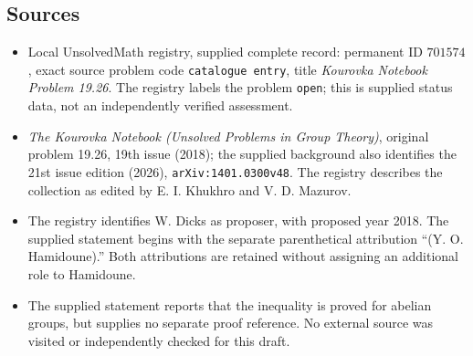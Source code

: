 \documentclass[11pt]{article}
\begin{document}
\subsection{Sources}
\begin{itemize}
\item Local UnsolvedMath registry, supplied complete record: permanent ID \(701574\), exact source problem code \texttt{catalogue entry}, title \emph{Kourovka Notebook Problem 19.26}. The registry labels the problem \texttt{open}; this is supplied status data, not an independently verified assessment.
\item \emph{The Kourovka Notebook (Unsolved Problems in Group Theory)}, original problem 19.26, 19th issue (2018); the supplied background also identifies the 21st issue edition (2026), \texttt{arXiv:1401.0300v48}. The registry describes the collection as edited by E. I. Khukhro and V. D. Mazurov.
\item The registry identifies W. Dicks as proposer, with proposed year 2018. The supplied statement begins with the separate parenthetical attribution ``(Y. O. Hamidoune).'' Both attributions are retained without assigning an additional role to Hamidoune.
\item The supplied statement reports that the inequality is proved for abelian groups, but supplies no separate proof reference. No external source was visited or independently checked for this draft.
\end{itemize}
\end{document}
